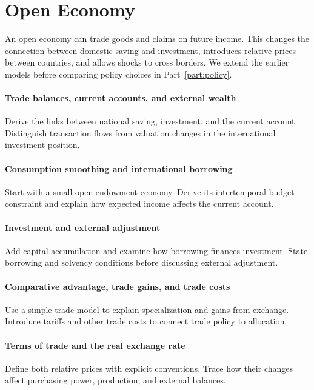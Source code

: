 \clearpage
\part{Open Economy}\label{part:open-economy}

An open economy can trade goods and claims on future income. This changes the
connection between domestic saving and investment, introduces relative prices
between countries, and allows shocks to cross borders. We extend the earlier
models before comparing policy choices in Part~\ref{part:policy}.

\clearpage
{}\label{sec:international-accounts}

\subsection{Trade balances, current accounts, and external wealth}
Derive the links between national saving, investment, and the current account.
Distinguish transaction flows from valuation changes in the international
investment position.

\subsection{Consumption smoothing and international borrowing}
Start with a small open endowment economy. Derive its intertemporal budget
constraint and explain how expected income affects the current account.

\subsection{Investment and external adjustment}
Add capital accumulation and examine how borrowing finances investment.
State borrowing and solvency conditions before discussing external adjustment.

\label{sec:trade}

\subsection{Comparative advantage, trade gains, and trade costs}
Use a simple trade model to explain specialization and gains from exchange.
Introduce tariffs and other trade costs to connect trade policy to allocation.

\subsection{Terms of trade and the real exchange rate}
Define both relative prices with explicit conventions. Trace how their changes
affect purchasing power, production, and external balances.

